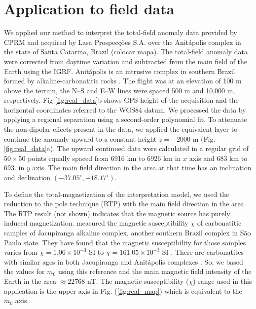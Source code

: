 \section{Application to field data}

We applied our method to interpret the total-field anomaly data provided by CPRM and acquired by Lasa Prospecções S.A. over the Anitápolis complex in the state of Santa Catarina, Brazil (colocar mapa). The total-field anomaly data were corrected from daytime variation and subtracted from the main field of the Earth using the IGRF. Anitápolis is an intrusive complex in southern Brazil formed by alkaline-carbonatitic rocks \cite[]{GOMES2018}. The flight was at an elevation of 100 m above the terrain, the N–S and E–W lines were spaced 500 m and 10,000 m, respectively. Fig \ref{fig:real_data}b shows GPS height of the acquisition and the horizontal coordinates referred to the WGS84 datum. We processed the data by applying a regional separation using a second-order polynomial fit. To attenuate the non-dipolar effects present in the data, we applied the equivalent layer \cite[]{dampney1969,emilia1973} to continue the anomaly upward to a constant height $z=-2000$ m (Fig. \ref{fig:real_data}a). The upward continued data were calculated in a regular grid of $50\times50$ points equally spaced from 6916 km to 6926 km in $x$ axis and 683 km to 693. in $y$ axis. The main field direction in the area at that time has an inclination and declination $(-37.05^\circ, -18.17^\circ)$.

To define the total-magnetization of the interpretation model, we used the reduction to the pole technique (RTP) with the main field direction in the area. The RTP result (not shown) indicates that the magnetic source has purely induced magnetization. \cite{valdivia-2009} measured the magnetic susceptibility $\chi$ of carbonatitic samples of Jacupiranga alkaline complex, another southern Brazil complex in São Paulo state. They have found that the magnetic susceptibility for those samples varies from $\chi = 1.06\times 10^{-3}$ SI to $\chi=161.05\times 10^{-3}$ SI \cite[][ tb. 1]{valdivia-2009}. There are carbonatites with similar ages in both Jacupiranga and Anitápolis complexes \cite[]{gibson-1999}. So, we based the values for $m_0$ using this reference and the main magnetic field intensity of the Earth in the area $ \approx 22768 $ nT. The magnetic susceptibility ($ \chi $) range used in this application is the upper axis in Fig. (\ref{fig:real_map}) which is equivalent to the $ m_0 $ axis.

